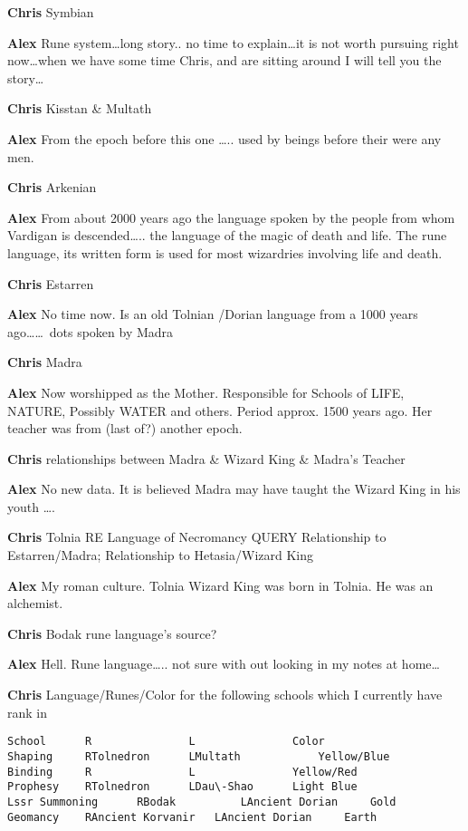 {\bf Chris}
Symbian

{\bf Alex }	
Rune system\dots long story.. no time to explain\dots it is not worth pursuing 
right now\dots when we have some time Chris, and are sitting around I will tell 
you the story\dots

{\bf Chris}
Kisstan \& Multath

{\bf Alex }	
From the epoch before this one \dots.. used by beings before their were any 
men.

{\bf Chris}
Arkenian

{\bf Alex }	
From about 2000 years ago the language spoken by the people from whom Vardigan 
is descended\dots.. the language of the magic of death and life. The rune language, 
its written form is used for most wizardries involving life and death.

{\bf Chris}
Estarren

{\bf Alex }	
No time now. Is an old Tolnian /Dorian language from a 1000 years ago\dots\dots\
dots spoken by Madra

{\bf Chris}
Madra

{\bf Alex }	
Now worshipped as the Mother. Responsible for Schools of LIFE, NATURE, Possibly 
WATER and others. Period approx. 1500 years ago. Her teacher was from (last 
of?) another epoch.

{\bf Chris}
relationships between Madra \& Wizard King \& Madra's Teacher

{\bf Alex }	
No new data. It is believed Madra may have taught the Wizard King in his youth
\dots.

{\bf Chris}
Tolnia
RE Language of Necromancy
QUERY Relationship to Estarren/Madra; Relationship to Hetasia/Wizard King

{\bf Alex }	
My roman culture. Tolnia Wizard King was born in Tolnia. He was an alchemist. 

{\bf Chris}
Bodak rune language's source?

{\bf Alex }	
Hell. Rune language\dots.. not sure with out looking in my notes at home\dots

{\bf Chris}
Language/Runes/Color for the following schools which I currently have rank in

\begin{verbatim}
School		R				L				Color
Shaping		RTolnedron		LMultath			Yellow/Blue
Binding		R				L				Yellow/Red
Prophesy	RTolnedron		LDau\-Shao		Light Blue
Lssr Summoning		RBodak			LAncient Dorian		Gold
Geomancy	RAncient Korvanir	LAncient Dorian		Earth
\end{verbatim}

